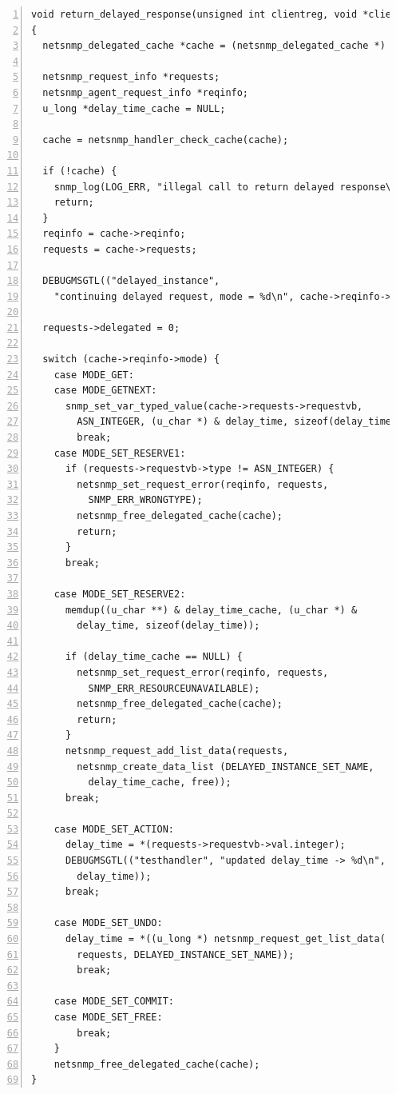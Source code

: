 \documentclass[12pt,ngerman,toc=listofnumbered,toc=bibliographynumbered,toc=index,headsepline=true]{scrbook}
\begin{document}
\begin{appendix}
\begin{lstlisting}[numbers=left]
void return_delayed_response(unsigned int clientreg, void *clientarg)
{
  netsnmp_delegated_cache *cache = (netsnmp_delegated_cache *) clientarg;
  
  netsnmp_request_info *requests;
  netsnmp_agent_request_info *reqinfo;
  u_long *delay_time_cache = NULL;

  cache = netsnmp_handler_check_cache(cache);

  if (!cache) {
    snmp_log(LOG_ERR, "illegal call to return delayed response\n");
    return;
  }
  reqinfo = cache->reqinfo;
  requests = cache->requests;

  DEBUGMSGTL(("delayed_instance",
    "continuing delayed request, mode = %d\n", cache->reqinfo->mode));

  requests->delegated = 0;

  switch (cache->reqinfo->mode) {
    case MODE_GET:
    case MODE_GETNEXT:
      snmp_set_var_typed_value(cache->requests->requestvb,
        ASN_INTEGER, (u_char *) & delay_time, sizeof(delay_time));
        break;
    case MODE_SET_RESERVE1:
      if (requests->requestvb->type != ASN_INTEGER) {
        netsnmp_set_request_error(reqinfo, requests,
          SNMP_ERR_WRONGTYPE);
        netsnmp_free_delegated_cache(cache);
        return;
      }
      break;

    case MODE_SET_RESERVE2:
      memdup((u_char **) & delay_time_cache, (u_char *) &
        delay_time, sizeof(delay_time));

      if (delay_time_cache == NULL) {
        netsnmp_set_request_error(reqinfo, requests,
          SNMP_ERR_RESOURCEUNAVAILABLE);
        netsnmp_free_delegated_cache(cache);
        return;
      }
      netsnmp_request_add_list_data(requests,
        netsnmp_create_data_list (DELAYED_INSTANCE_SET_NAME,
          delay_time_cache, free));
      break;

    case MODE_SET_ACTION:
      delay_time = *(requests->requestvb->val.integer);
      DEBUGMSGTL(("testhandler", "updated delay_time -> %d\n",
        delay_time));
      break;

    case MODE_SET_UNDO:
      delay_time = *((u_long *) netsnmp_request_get_list_data(
        requests, DELAYED_INSTANCE_SET_NAME));
        break;

    case MODE_SET_COMMIT:
    case MODE_SET_FREE:
        break;
    }
    netsnmp_free_delegated_cache(cache);
}
\end{lstlisting}
\end{appendix}
\newpage



\chapter*{}
\thispagestyle{empty}
\end{document}
